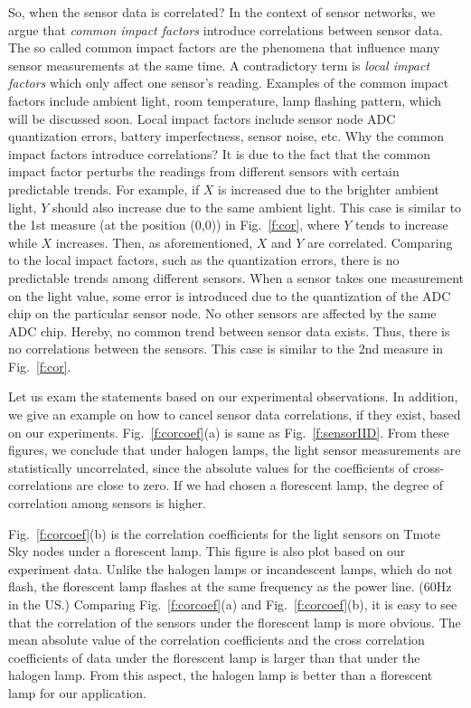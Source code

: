     So, when the sensor data is correlated? In the context of sensor networks, we argue that {\it common impact factors} introduce correlations between sensor data. The so called common impact factors are the phenomena that influence many sensor measurements at the same time. A contradictory term is {\it local impact factors} which only affect one sensor's reading. Examples of the common impact factors include ambient light, room temperature, lamp flashing pattern, which will be discussed soon. Local impact factors include sensor node ADC quantization errors, battery imperfectness, sensor noise, etc.
        Why the common impact factors introduce correlations?
            It is due to the fact that the common impact factor perturbs the readings from different sensors with certain predictable trends.
                For example, if $X$ is increased due to the brighter ambient light, $Y$ should also increase due to the same ambient light. This case is similar to the 1st measure (at the position (0,0)) in Fig.~\ref{f:cor}, where $Y$ tends to increase while $X$ increases. Then, as aforementioned, $X$ and $Y$ are correlated.
            Comparing to the local impact factors, such as the quantization errors, there is no predictable trends among different sensors.
    When a sensor takes one measurement on the light value, some error is introduced due to the quantization of the ADC chip on the particular sensor node. No other sensors are affected by the same ADC chip.
      Hereby, no common trend between sensor data exists.
        Thus, there is no correlations between the sensors. This case is similar to the 2nd measure in Fig.~\ref{f:cor}.


Let us exam the statements based on our experimental observations. In addition, we give an example on how to cancel sensor data correlations, if they exist, based on our experiments.
 Fig.~\ref{f:corcoef}(a) is same as Fig.~\ref{f:sensorIID}. From these figures, we conclude that under halogen lamps, the light sensor measurements are statistically uncorrelated, since the absolute values for the coefficients of cross-correlations are close to zero.
    If we had chosen a florescent lamp, the degree of correlation among sensors is higher.


    Fig.~\ref{f:corcoef}(b) is the correlation coefficients for the light sensors on Tmote Sky nodes under a florescent lamp. This figure is also plot based on our experiment data.
    Unlike the halogen lamps or incandescent lamps, which do not flash, the florescent lamp flashes at the same frequency as the power line. (60Hz in the US.) Comparing Fig.~\ref{f:corcoef}(a) and Fig.~\ref{f:corcoef}(b), it is easy to see that the correlation of the sensors under the florescent lamp is more obvious. The mean absolute value of the correlation coefficients and the cross correlation coefficients of data under the florescent lamp is larger than that under the halogen lamp.
    From this aspect, the halogen lamp is better than a florescent lamp for our application.


